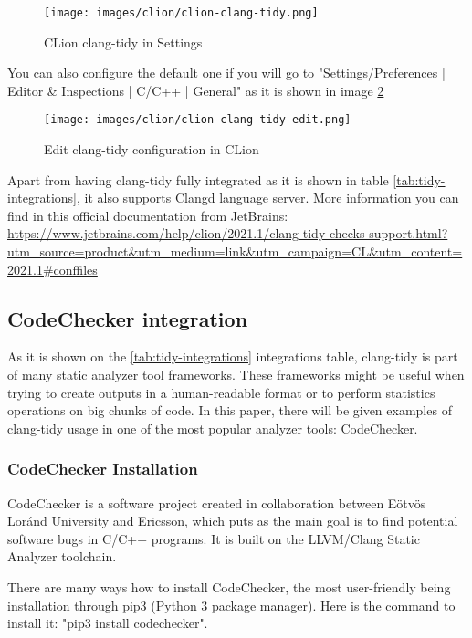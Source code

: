 \begin{figure}[H]
	\centering
        \caption{CLion clang-tidy in Settings}
	\texttt{[image: images/clion/clion-clang-tidy.png]}
	\label{fig:clion-clang-tidy}
\end{figure}

You can also configure the default one if you will go to "Settings/Preferences | Editor \& Inspections | C/C++ | General" as it is shown in image \ref{fig:clion-clang-tidy-conf}

\begin{figure}[H]
	\centering
        \caption{Edit clang-tidy configuration in CLion}
	\texttt{[image: images/clion/clion-clang-tidy-edit.png]}
	\label{fig:clion-clang-tidy-conf}
\end{figure}

Apart from having clang-tidy fully integrated as it is shown in table \ref{tab:tidy-integrations}, it also supports Clangd language server. More information you can find in this official documentation from JetBrains: \url{https://www.jetbrains.com/help/clion/2021.1/clang-tidy-checks-support.html?utm\_source=product&utm\_medium=link&utm\_campaign=CL&utm\_content=2021.1#conffiles}


\subsection{CodeChecker integration}

As it is shown on the \ref{tab:tidy-integrations} integrations table, clang-tidy is part of many static analyzer tool frameworks. These frameworks might be useful when trying to create outputs in a human-readable format or to perform statistics operations on big chunks of code. In this paper, there will be given examples of clang-tidy usage in one of the most popular analyzer tools: CodeChecker. 

\subsubsection{CodeChecker Installation} 
CodeChecker \cite{codechecker-elte} is a software project created in collaboration between Eötvös Loránd University and Ericsson, which puts as the main goal is to find potential software bugs in C/C++ programs. It is built on the LLVM/Clang Static Analyzer toolchain. 

There are many ways how to install CodeChecker, the most user-friendly being installation through pip3 (Python 3 package manager). Here is the command to install it: "pip3 install codechecker". 

